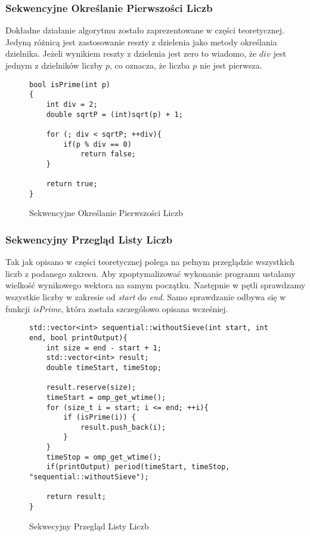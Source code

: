 \documentclass{article}
\begin{document}
            \subsubsection{Sekwencyjne Określanie Pierwszości Liczb}
                Dokładne działanie algorytmu zostało zaprezentowane w części teoretycznej. Jedyną różnicą jest zastosowanie reszty z dzielenia jako metody określania dzielnika. Jeżeli wynikiem reszty z dzielenia jest zero to wiadomo, że $div$ jest jednym z dzielników liczby $p$, co oznacza, że liczba $p$ nie jest pierwsza.
                \begin{figure}[H]
                    \begin{verbatim}
bool isPrime(int p)
{
	int div = 2;
	double sqrtP = (int)sqrt(p) + 1;

	for (; div < sqrtP; ++div){ 
		if(p % div == 0) 
			return false;
	}

	return true;
}
                    \end{verbatim}
                    \caption{Sekwencyjne Określanie Pierwszości Liczb}
                \end{figure}
                
            \subsubsection{Sekwencyjny Przegląd Listy Liczb}
            Tak jak opisano w części teoretycznej polega na pełnym przeglądzie wszystkich liczb z podanego zakresu. Aby zpoptymalizować wykonanie programu ustalamy wielkość wynikowego wektora na samym początku. Następnie w pętli sprawdzamy wszystkie liczby w zakresie od \emph{start} do \emph{end}. Samo sprawdzanie odbywa się w funkcji \emph{isPrime}, która została szczególowo opisana wcześniej.
                \begin{figure}[H]
                    \begin{verbatim}
std::vector<int> sequential::withoutSieve(int start, int end, bool printOutput){
    int size = end - start + 1;
    std::vector<int> result;
    double timeStart, timeStop;
                
    result.reserve(size);
    timeStart = omp_get_wtime();
    for (size_t i = start; i <= end; ++i){
        if (isPrime(i)) {
            result.push_back(i);
        }
    }
    timeStop = omp_get_wtime();
    if(printOutput) period(timeStart, timeStop, "sequential::withoutSieve");
                
    return result;
}
                    \end{verbatim}
                    \caption{Sekwecyjny Przegląd Listy Liczb}
                \end{figure}
                
\end{document}
